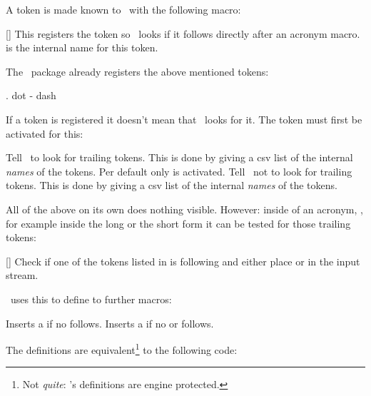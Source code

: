 \documentclass{acro-manual}
\begin{document}
A token is made known to \acro\ with the following macro:
\begin{commands}
  []
    This registers the token  so \acro\ looks if it follows
    directly after an acronym macro.   is the internal name for
    this token.
\end{commands}
The \acro\ package already registers the above mentioned tokens:
\begin{sourcecode}
  \AcroRegisterTrailing . {dot}
  \AcroRegisterTrailing - {dash}
  \AcroRegisterTrailing {}
\end{sourcecode}

If a token is registered it doesn't mean that \acro\ looks for it.  The token
must first be activated for this:
\begin{options}
    Tell \acro\ to look for trailing tokens.  This is done by giving a csv
    list of the internal \emph{names} of the tokens.  Per default only
     is activated.
    Tell \acro\ not to look for trailing tokens.  This is done by giving a csv
    list of the internal \emph{names} of the tokens.
\end{options}

All of the above on its own does nothing visible. However: inside of an
acronym, \ie, for example inside the long or the short form it can be tested
for those trailing tokens:
\begin{commands}
  []
    Check if one of the tokens listed in  is
    following and either place  or  in the input
    stream.
\end{commands}
\acro\ uses this to define to further macros:
\begin{commands}
   Inserts a  if no  follows.
   Inserts a  if no  or
     follows.
\end{commands}
The definitions are equivalent\footnote{Not \emph{quite}: \acro's definitions
  are engine protected.} to the following code:
\begin{sourcecode}
  \newcommand*\acdot{\aciftrailing{dot}{}{.\@}}
  \newcommand*\acspace{\aciftrailing{dash,babel-hyphen}{}{\space}}
\end{sourcecode}
\end{document}
